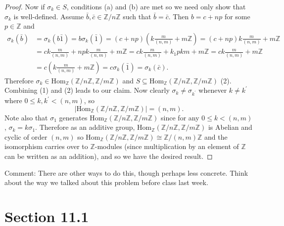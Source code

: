 \documentclass[10pt]{article}
\newcommand{\Z}{\mathbb{Z}}
\begin{document}
\begin{itemize}
\begin{proof}
Now if $\sigma_k \in S$, conditions (a) and (b) are met so we need only show that $\sigma_k$ is well-defined. Assume $\bar{b},\bar{c} \in \Z/n\Z$ such that $\bar{b}=\bar{c}$. Then $b=c+np$ for some $p \in \Z$ and
\begin{align*}
\sigma_k(\bar{b})&= \sigma_k(b\bar{1})=b\sigma_k(\bar{1})=(c+np)\left(k\frac{m}{(n,m)}+m\Z\right) = (c+np)k \frac{m}{(n,m)}+m\Z\\
&=ck\frac{m}{(n,m)}+npk\frac{m}{(n,m)}+m\Z= ck \frac{m}{(n,m)}+k_1pkm+m\Z=ck\frac{m}{(n,m)}+m\Z\\
&=c\left(k\frac{m}{(n,m)}+m\Z\right)=c\sigma_k(\bar{1})=\sigma_k(\bar{c}).
\end{align*}
Therefore $\sigma_k \in \text{Hom}_{\Z}(\Z/n\Z,\Z/m\Z)$ and $S \subseteq \text{Hom}_{\Z}(\Z/n\Z,\Z/m\Z)$ (2). Combining (1) and (2) leads to our claim. Now clearly $\sigma_k \neq \sigma_{k^{'}}$ whenever $k \neq k^{'}$ where $0 \leq k,k^{'} <(n,m)$, so
$$\left|\text{Hom}_{\Z}(\Z/n\Z,\Z/m\Z)\right|=(n,m).$$
Note also that $\sigma_1$ generates $\text{Hom}_{\Z}(\Z/n\Z,\Z/m\Z)$ since for any $0 \leq k <(n,m)$, $\sigma_k=k\sigma_1$.
Therefore as an additive group, $\text{Hom}_{\Z}(\Z/n\Z,\Z/m\Z)$ is Abelian and cyclic of order $(n,m)$ so $\text{Hom}_{\Z}(\Z/n\Z,\Z/m\Z) \cong \Z/(n,m)\Z$ and the isomorphism carries over to $\Z$-modules (since multiplication by an element of $\Z$ can be written as an addition), and so we have the desired result.
\end{proof}

{\sc Comment:}  There are other ways to do this, though perhaps less concrete.
Think about the way we talked about this problem before class last week.

\end{itemize}

\section*{Section 11.1}
\end{document}
